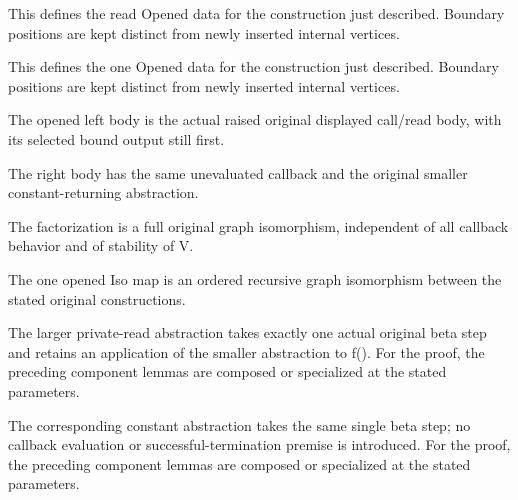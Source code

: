 This defines the read Opened data for the construction just described. Boundary positions are kept distinct from newly inserted internal vertices.
\par{}

This defines the one Opened data for the construction just described. Boundary positions are kept distinct from newly inserted internal vertices.
\par{}

The opened left body is the actual raised original displayed call/read body, with its selected bound output still first.
\par{}

The right body has the same unevaluated callback and the original smaller constant-returning abstraction.
\par{}

The factorization is a full original graph isomorphism, independent of all callback behavior and of stability of V.
\par{}

The one opened Iso map is an ordered recursive graph isomorphism between the stated original constructions.
\par{}

The larger private-read abstraction takes exactly one actual original beta step and retains an application of the smaller abstraction to f().
For the proof, the preceding component lemmas are composed or specialized at the stated parameters.
\par{}

The corresponding constant abstraction takes the same single beta step; no callback evaluation or successful-termination premise is introduced.
For the proof, the preceding component lemmas are composed or specialized at the stated parameters.
\par{}

